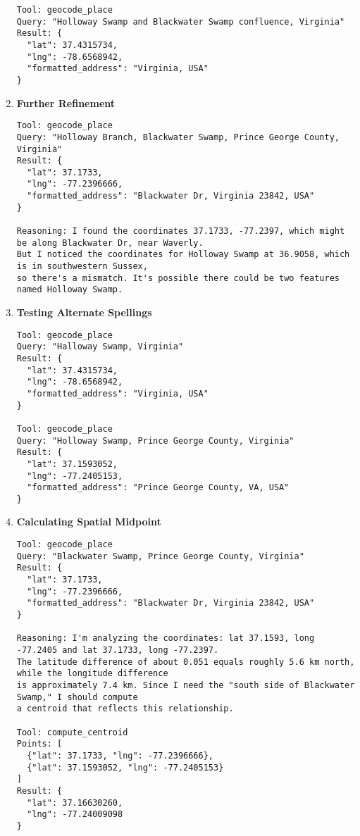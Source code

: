 \begin{enumerate}
\begin{lstlisting}
Tool: geocode_place
Query: "Holloway Swamp and Blackwater Swamp confluence, Virginia"
Result: {
  "lat": 37.4315734, 
  "lng": -78.6568942, 
  "formatted_address": "Virginia, USA"
}
\end{lstlisting}
\item
  \textbf{Further Refinement}

\begin{lstlisting}
Tool: geocode_place
Query: "Holloway Branch, Blackwater Swamp, Prince George County, Virginia"
Result: {
  "lat": 37.1733, 
  "lng": -77.2396666, 
  "formatted_address": "Blackwater Dr, Virginia 23842, USA"
}

Reasoning: I found the coordinates 37.1733, -77.2397, which might be along Blackwater Dr, near Waverly. 
But I noticed the coordinates for Holloway Swamp at 36.9058, which is in southwestern Sussex, 
so there's a mismatch. It's possible there could be two features named Holloway Swamp.
\end{lstlisting}
\item
  \textbf{Testing Alternate Spellings}

\begin{lstlisting}
Tool: geocode_place
Query: "Halloway Swamp, Virginia"
Result: {
  "lat": 37.4315734, 
  "lng": -78.6568942, 
  "formatted_address": "Virginia, USA"
}

Tool: geocode_place
Query: "Holloway Swamp, Prince George County, Virginia"
Result: {
  "lat": 37.1593052, 
  "lng": -77.2405153, 
  "formatted_address": "Prince George County, VA, USA"
}
\end{lstlisting}
\item
  \textbf{Calculating Spatial Midpoint}

\begin{lstlisting}
Tool: geocode_place
Query: "Blackwater Swamp, Prince George County, Virginia"
Result: {
  "lat": 37.1733, 
  "lng": -77.2396666, 
  "formatted_address": "Blackwater Dr, Virginia 23842, USA"
}

Reasoning: I'm analyzing the coordinates: lat 37.1593, long -77.2405 and lat 37.1733, long -77.2397.
The latitude difference of about 0.051 equals roughly 5.6 km north, while the longitude difference
is approximately 7.4 km. Since I need the "south side of Blackwater Swamp," I should compute
a centroid that reflects this relationship.

Tool: compute_centroid
Points: [
  {"lat": 37.1733, "lng": -77.2396666}, 
  {"lat": 37.1593052, "lng": -77.2405153}
]
Result: {
  "lat": 37.16630260, 
  "lng": -77.24009098
}
\end{lstlisting}
\end{enumerate}

